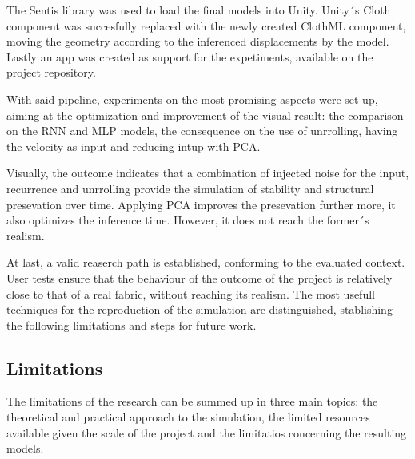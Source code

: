 The Sentis library was used to load the final models into Unity. Unity´s Cloth component was succesfully replaced with the newly created ClothML component, moving the geometry according to the inferenced displacements by the model. Lastly an app was created as support for the expetiments, available on the project repository. \newline

With said pipeline, experiments on the most promising aspects were set up, aiming at the optimization and improvement of the visual result: the comparison on the RNN and MLP models, the consequence on the use of unrrolling, having the velocity as input and reducing intup with PCA.\newline

Visually, the outcome indicates that a combination of injected noise for the input, recurrence and unrrolling provide the simulation of stability and structural presevation over time. Applying PCA improves the presevation further more, it also optimizes the inference time. However, it does not reach the former´s realism. \newline

At last, a valid reaserch path is established, conforming to the evaluated context. User tests ensure that the behaviour of the outcome of the project is relatively close to that of a real fabric, without reaching its realism. The most usefull techniques for the reproduction of the simulation are distinguished, stablishing the following limitations and steps for future work.

\subsection*{Limitations}
The limitations of the research can be summed up in three main topics: the theoretical and practical approach to the simulation, the limited resources available given the scale of the project and the limitatios concerning the resulting models.\newline


